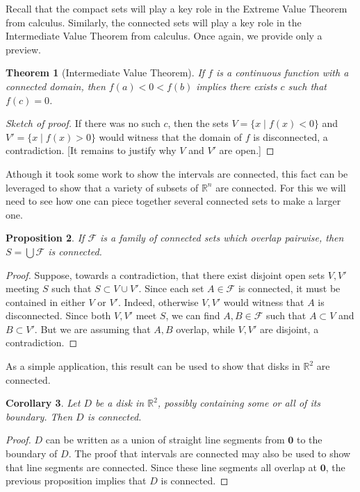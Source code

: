 \documentclass[11pt,oneside]{amsbook}
\newcommand{\R}{\mathbb R}
\theoremstyle{definition}
\theoremstyle{plain}
\newtheorem{theorem}{Theorem}[section]
\newtheorem{corollary}[theorem]{Corollary}
\newtheorem{proposition}[theorem]{Proposition}
\theoremstyle{definition}
\theoremstyle{remark}
\numberwithin{equation}{section}
\numberwithin{figure}{section}
\begin{document}
Recall that the compact sets will play a key role in the Extreme Value Theorem from calculus. Similarly, the connected sets will play a key role in the Intermediate Value Theorem from calculus. Once again, we provide only a preview.

\begin{theorem}[Intermediate Value Theorem]
  If $f$ is a continuous function with a connected domain, then $f(a)<0<f(b)$ implies there exists $c$ such that $f(c)=0$.
\end{theorem}

\begin{proof}[Sketch of proof]
  If there was no such $c$, then the sets $V=\{x\mid f(x)<0\}$ and $V'=\{x\mid f(x)>0\}$ would witness that the domain of $f$ is disconnected, a contradiction. [It remains to justify why $V$ and $V'$ are open.]
\end{proof}

Athough it took some work to show the intervals are connected, this fact can be leveraged to show that a variety of subsets of $\R^n$ are connected. For this we will need to see how one can piece together several connected sets to make a larger one.

\begin{proposition}
  If $\mathcal F$ is a family of connected sets which overlap pairwise, then $S=\bigcup\mathcal F$ is connected.
\end{proposition}

\begin{proof}
  Suppose, towards a contradiction, that there exist disjoint open sets $V,V'$ meeting $S$ such that $S\subset V\cup V'$. Since each set $A\in\mathcal F$ is connected, it must be contained in either $V$ or $V'$. Indeed, otherwise $V,V'$ would witness that $A$ is disconnected. Since both $V,V'$ meet $S$, we can find $A,B\in\mathcal F$ such that $A\subset V$ and $B\subset V'$. But we are assuming that $A,B$ overlap, while $V,V'$ are disjoint, a contradiction.
\end{proof}

As a simple application, this result can be used to show that disks in $\R^2$ are connected.

\begin{corollary}
  Let $D$ be a disk in $\R^2$, possibly containing some or all of its boundary. Then $D$ is connected.
\end{corollary}

\begin{proof}
  $D$ can be written as a union of straight line segments from $\mathbf{0}$ to the boundary of $D$. The proof that intervals are connected may also be used to show that line segments are connected. Since these line segments all overlap at $\mathbf{0}$, the previous proposition implies that $D$ is connected.
\end{proof}
\end{document}
